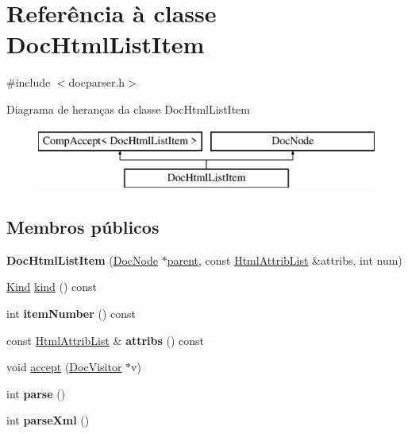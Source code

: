 \hypertarget{class_doc_html_list_item}{\section{Referência à classe Doc\-Html\-List\-Item}
\label{class_doc_html_list_item}
}


{\ttfamily \#include $<$docparser.\-h$>$}

Diagrama de heranças da classe Doc\-Html\-List\-Item\begin{figure}[H]
\begin{center}
\leavevmode
\includegraphics[height=2.000000cm]{class_doc_html_list_item}
\end{center}
\end{figure}
\subsection*{Membros públicos}
\begin{DoxyCompactItemize}
\item 
\hypertarget{class_doc_html_list_item_a82c698e6c0ad89c5ec664beaaefa18cd}{{\bfseries Doc\-Html\-List\-Item} (\hyperlink{class_doc_node}{Doc\-Node} $\ast$\hyperlink{class_doc_node_abd7f070d6b0a38b4da71c2806578d19d}{parent}, const \hyperlink{class_html_attrib_list}{Html\-Attrib\-List} \&attribs, int num)}\label{class_doc_html_list_item_a82c698e6c0ad89c5ec664beaaefa18cd}

\item 
\hyperlink{class_doc_node_aa10c9e8951b8ccf714a59ec321bdac5b}{Kind} \hyperlink{class_doc_html_list_item_aa9d037bed9f9a083d0cd01485637d843}{kind} () const 
\item 
\hypertarget{class_doc_html_list_item_aab230540db83077dc3c2bf369d007c1e}{int {\bfseries item\-Number} () const }\label{class_doc_html_list_item_aab230540db83077dc3c2bf369d007c1e}

\item 
\hypertarget{class_doc_html_list_item_aae3c838ea3d3273b35d07e9965a8985e}{const \hyperlink{class_html_attrib_list}{Html\-Attrib\-List} \& {\bfseries attribs} () const }\label{class_doc_html_list_item_aae3c838ea3d3273b35d07e9965a8985e}

\item 
void \hyperlink{class_doc_html_list_item_a7ba716e854ae2f8f87a4eb2140e302b6}{accept} (\hyperlink{class_doc_visitor}{Doc\-Visitor} $\ast$v)
\item 
\hypertarget{class_doc_html_list_item_a67007fc2be130666fbf3b065022756f4}{int {\bfseries parse} ()}\label{class_doc_html_list_item_a67007fc2be130666fbf3b065022756f4}

\item 
\hypertarget{class_doc_html_list_item_a80866a0f93fec97bbcf5b54a48fd8ead}{int {\bfseries parse\-Xml} ()}\label{class_doc_html_list_item_a80866a0f93fec97bbcf5b54a48fd8ead}

\end{DoxyCompactItemize}
